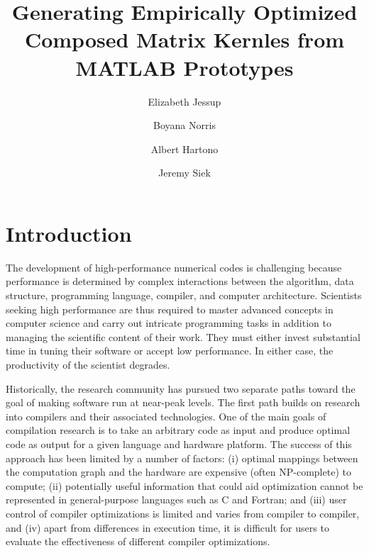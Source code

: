 \documentclass[runningheads]{llncs}
\begin{document}
\mainmatter  %

\title{Generating Empirically Optimized Composed Matrix Kernles from MATLAB Prototypes}


\author{Elizabeth Jessup 
  \and Boyana Norris
  \and Albert Hartono
  \and Jeremy Siek}



\maketitle



\section{Introduction}
\label{sec:intro}

The development of high-performance numerical codes is challenging because
performance is determined by complex interactions between the algorithm, data
structure, programming language, compiler, and computer
architecture. Scientists seeking high performance are thus required to master
advanced concepts in computer science and carry out intricate programming
tasks in addition to managing the scientific content of their work.  They
must either invest substantial time in tuning their software or accept low
performance. In either case, the productivity of the scientist degrades.

Historically, the research community has pursued two separate paths toward
the goal of making software run at near-peak levels.  The first path builds
on research into compilers and their associated technologies.  One of the
main goals of compilation research is to take an arbitrary code as input and
produce optimal code as output for a given language and hardware platform.
The success of this approach has been limited by a number of factors: (i)
optimal mappings between the computation graph and the hardware are expensive
(often NP-complete) to compute; (ii) potentially useful information that
could aid optimization cannot be represented in general-purpose languages
such as C and Fortran; and (iii) user control of compiler optimizations is
limited and varies from compiler to compiler, and (iv) apart from differences
in execution time, it is difficult for users to evaluate the effectiveness of
different compiler optimizations.
\end{document}
